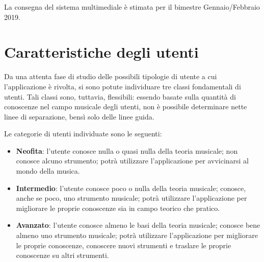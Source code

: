La consegna del sistema multimediale è stimata per il bimestre Gennaio/Febbraio 2019.

\section{Caratteristiche degli utenti}
Da una attenta fase di studio delle possibili tipologie di utente a cui l'applicazione è rivolta, si sono potute individuare tre classi fondamentali di utenti. Tali classi sono, tuttavia, flessibili: essendo basate sulla quantità di conoscenze nel campo musicale degli utenti, non è possibile determinare nette linee di separazione, bensì solo delle linee guida.

Le categorie di utenti individuate sono le seguenti:
\begin{itemize}
	\item \textbf{Neofita}: l'utente conosce nulla o quasi nulla della teoria musicale; non conosce alcuno strumento; potrà utilizzare l'applicazione per avvicinarsi al mondo della musica.
	\item \textbf{Intermedio}: l'utente conosce poco o nulla della teoria musicale; conosce, anche se poco, uno strumento musicale; potrà utilizzare l'applicazione per migliorare le proprie conoscenze sia in campo teorico che pratico.
	\item \textbf{Avanzato}: l'utente conosce almeno le basi della teoria musicale; conosce bene almeno uno strumento musicale; potrà utilizzare l'applicazione per migliorare le proprie conoscenze, conoscere nuovi strumenti e traslare le proprie conoscenze su altri strumenti.
\end{itemize}

